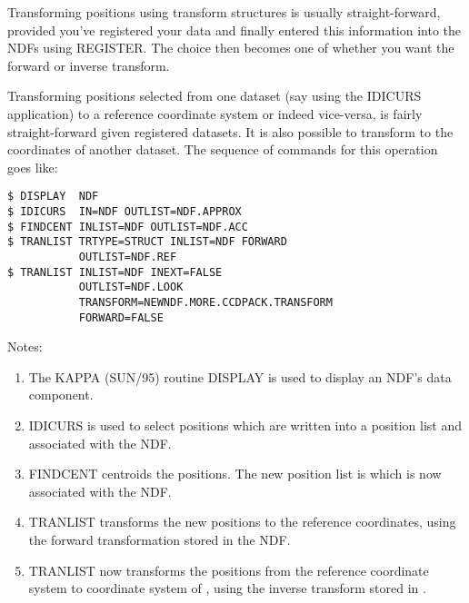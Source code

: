 Transforming positions using transform structures is usually
straight-forward, provided you've registered your data and finally
entered this information into the NDFs using REGISTER. The choice then
becomes one of whether you want the forward or inverse transform.

Transforming positions selected from one dataset (say using the IDICURS
application) to a reference coordinate system or indeed vice-versa, is
fairly straight-forward given registered datasets. It is also possible
to transform to the coordinates of another dataset. The sequence of
commands for this operation goes like:

\begin{myquote}
\verb+$ DISPLAY  NDF                              +  \\
\verb+$ IDICURS  IN=NDF OUTLIST=NDF.APPROX        +  \\
\verb+$ FINDCENT INLIST=NDF OUTLIST=NDF.ACC       +  \\
\verb+$ TRANLIST TRTYPE=STRUCT INLIST=NDF FORWARD + \\
\verb+           OUTLIST=NDF.REF                  +  \\  
\verb+$ TRANLIST INLIST=NDF INEXT=FALSE           + \\
\verb+           OUTLIST=NDF.LOOK                 + \\
\verb+           TRANSFORM=NEWNDF.MORE.CCDPACK.TRANSFORM + \\
\verb+           FORWARD=FALSE                    +  
\end{myquote}

Notes:
\begin{enumerate}
\item The KAPPA (SUN/95) routine DISPLAY is used to display an NDF's 
data component.
\item IDICURS is used to select positions which are written into a
position list  and associated with the NDF.
\item FINDCENT centroids the positions. The new position list is
 which is now associated with the NDF.
\item TRANLIST transforms the new positions to the reference 
coordinates, using the forward transformation stored in the NDF.
\item TRANLIST now transforms the positions from the reference
coordinate system to coordinate system of , using the
inverse transform stored in .
\end{enumerate}

